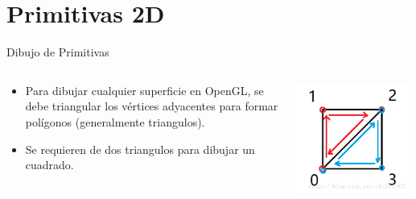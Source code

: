 \documentclass[aspectratio=169,compress]{beamer}
\begin{document}
\section{Primitivas 2D}
\begin{frame}{Dibujo de Primitivas}
\begin{columns}
\begin{column}{0.4\textwidth}
\begin{itemize}
\item Para dibujar cualquier superficie en OpenGL, se debe triangular los vértices adyacentes para formar polígonos (generalmente triangulos).
\item Se requieren de dos triangulos para dibujar un cuadrado.
\end{itemize}


\end{column}
\begin{column}{0.3\textwidth}
\begin{center}
 \includegraphics[width=0.98\textwidth]{FigsOpenGL/Cuadrado_Formado_por_Triangles}
 \end{center}


\end{column}
\end{columns}
\end{frame}
\end{document}

